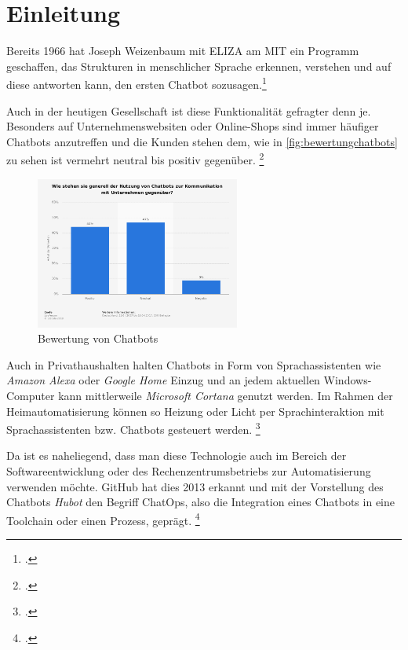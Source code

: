 \chapter{Einleitung}

Bereits 1966 hat Joseph Weizenbaum mit ELIZA am \acf{MIT} ein Programm geschaffen, das Strukturen in menschlicher Sprache erkennen, verstehen und auf diese antworten kann, den ersten Chatbot sozusagen.\footcite[Vgl.][o. \pno]{Weizenbaum_1966}

Auch in der heutigen Gesellschaft ist diese Funktionalität gefragter denn je. Besonders auf Unternehmenswebsiten oder Online-Shops sind immer häufiger Chatbots anzutreffen und die Kunden stehen dem, wie in \autoref{fig:bewertungchatbots} zu sehen ist vermehrt neutral bis positiv gegenüber.
\footcite[Vgl.][50]{Groetz_2018_Sprich_mit_mir}


\begin{figure}[H]
  \centering
  \includegraphics[width=0.6\textwidth]{Anhang/2018_stat_bewertung_chatbots}
  \caption{Bewertung von Chatbots}
\label{fig:bewertungchatbots}
\end{figure}

Auch in Privathaushalten halten Chatbots in Form von Sprachassistenten wie \textit{Amazon Alexa} oder \textit{Google Home} Einzug und an jedem aktuellen Windows-Computer kann mittlerweile \textit{Microsoft Cortana} genutzt werden. Im Rahmen der Heimautomatisierung können so Heizung oder Licht per Sprachinteraktion mit Sprachassistenten bzw. Chatbots gesteuert werden. \footcite[Vgl.][o. \pno]{Kuhn_2015_Sprachassistenten}

Da ist es naheliegend, dass man diese Technologie auch im Bereich der Softwareentwicklung oder des Rechenzentrumsbetriebs zur Automatisierung verwenden möchte. GitHub hat dies 2013 erkannt und mit der Vorstellung des Chatbots \textit{Hubot} den Begriff ChatOps, also die Integration eines Chatbots in eine Toolchain oder einen Prozess, geprägt. \footcite[Vgl.][o. \pno]{GitHub_2013_Chatops}

